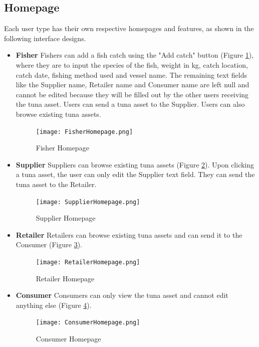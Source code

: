 \subsection{Homepage}
Each user type has their own respective homepages and features, as shown in the following interface designs.
\begin{itemize}
	\item \textbf{Fisher}
	Fishers can add a fish catch using the "Add catch" button (Figure \ref{fig:fisherhome_page}), where they are to input the species of the fish, weight in kg, catch location, catch date, fishing method used and vessel name. The remaining text fields like the Supplier name, Retailer name and Consumer name are left null and cannot be edited because they will be filled out by the other users receiving the tuna asset. Users can send a tuna asset to the Supplier. Users can also browse existing tuna assets. 
	
	\begin{figure}[H]
		\centering
		\texttt{[image: FisherHomepage.png]}
		\caption{Fisher Homepage}
		\label{fig:fisherhome_page}
	\end{figure}
	
	\item \textbf{Supplier}
	Suppliers can browse existing tuna assets (Figure \ref{fig:supplierhome_page}). Upon clicking a tuna asset, the user can only edit the Supplier text field. They can send the tuna asset to the Retailer.
	
	\begin{figure}[H]
		\centering
		\texttt{[image: SupplierHomepage.png]}
		\caption{Supplier Homepage}
		\label{fig:supplierhome_page}
	\end{figure}
	
	\item \textbf{Retailer}
	Retailers can browse existing tuna assets and can send it to the Consumer (Figure \ref{fig:retailerhome_page}).
	
	\begin{figure}[H]
		\centering
		\texttt{[image: RetailerHomepage.png]}
		\caption{Retailer Homepage}
		\label{fig:retailerhome_page}
	\end{figure}
	
	\item \textbf{Consumer}
	Consumers can only view the tuna asset and cannot edit anything else (Figure \ref{fig:consumerhome_page}).
	
	\begin{figure}[H]
		\centering
		\texttt{[image: ConsumerHomepage.png]}
		\caption{Consumer Homepage}
		\label{fig:consumerhome_page}
	\end{figure}
	
\end{itemize}

